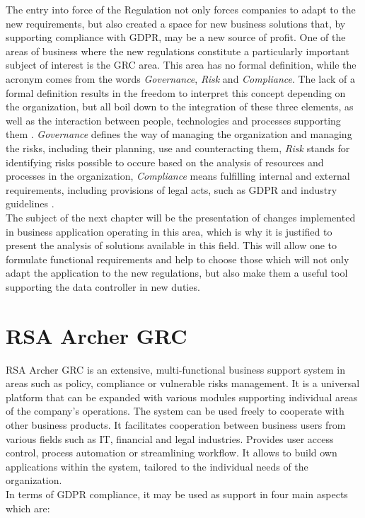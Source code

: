\documentclass[en, noamssymb]{mgr}
\begin{document}
The entry into force of the Regulation not only forces companies to adapt to the new requirements, but also created a space for new business solutions that, by supporting compliance with GDPR, may be a new source of profit. One of the areas of business where the new regulations constitute a particularly important subject of interest is the GRC area. This area has no formal definition, while the acronym comes from the words \textit{Governance}, \textit{Risk} and \textit{Compliance}. The lack of a formal definition results in the freedom to interpret this concept depending on the organization, but all boil down to the integration of these three elements, as well as the interaction between people, technologies and processes supporting them \cite{grc_2017}. \textit{Governance} defines the way of managing the organization and managing the risks, including their planning, use and counteracting them, \textit{Risk} stands for identifying risks possible to occure based on the analysis of resources and processes in the organization, \textit{Compliance} means fulfilling internal and external requirements, including provisions of legal acts, such as GDPR and industry guidelines \cite{grc_2017}.\\
\indent The subject of the next chapter will be the presentation of changes implemented in business application operating in this area, which is why it is justified to present the analysis of solutions available in this field. This will allow one to formulate functional requirements and help to choose those which will not only adapt the application to the new regulations, but also make them a useful tool supporting the data controller in new duties.

\section{RSA Archer GRC}

RSA Archer GRC is an extensive, multi-functional business support system in areas such as policy, compliance or vulnerable risks management. It is a universal platform that can be expanded with various modules supporting individual areas of the company's operations. The system can be used freely to cooperate with other business products. It facilitates cooperation between business users from various fields such as IT, financial and legal industries. Provides user access control, process automation or streamlining workflow. It allows to build own applications within the system, tailored to the individual needs of the organization.\\
\indent In terms of GDPR compliance, it may be used as support in four main aspects which are:
\end{document}
